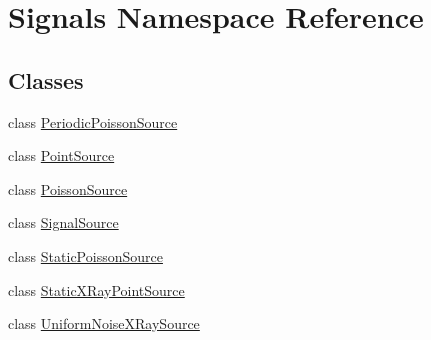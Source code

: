 \hypertarget{namespaceSignals}{}\section{Signals Namespace Reference}
\label{namespaceSignals}
\subsection*{Classes}
\begin{DoxyCompactItemize}
\item 
class \hyperlink{classSignals_1_1PeriodicPoissonSource}{Periodic\+Poisson\+Source}
\item 
class \hyperlink{classSignals_1_1PointSource}{Point\+Source}
\item 
class \hyperlink{classSignals_1_1PoissonSource}{Poisson\+Source}
\item 
class \hyperlink{classSignals_1_1SignalSource}{Signal\+Source}
\item 
class \hyperlink{classSignals_1_1StaticPoissonSource}{Static\+Poisson\+Source}
\item 
class \hyperlink{classSignals_1_1StaticXRayPointSource}{Static\+X\+Ray\+Point\+Source}
\item 
class \hyperlink{classSignals_1_1UniformNoiseXRaySource}{Uniform\+Noise\+X\+Ray\+Source}
\end{DoxyCompactItemize}
